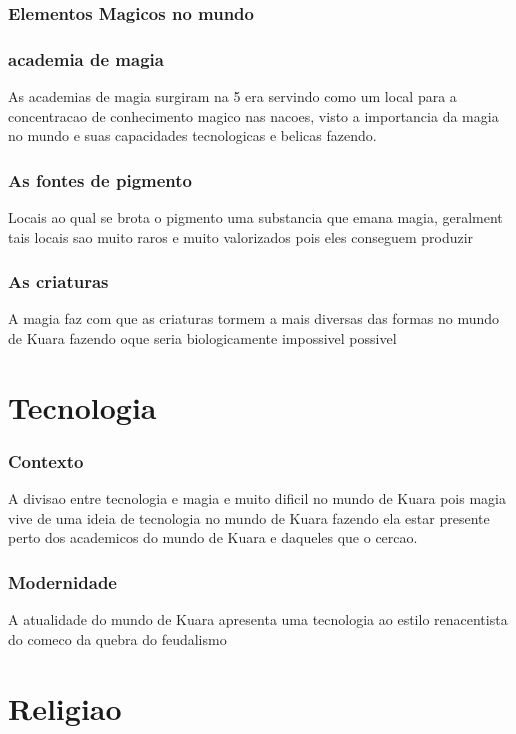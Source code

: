 \documentclass{book}
\begin{document}
\section*{Elementos Magicos no mundo }
\section*{academia de magia}
As academias de magia surgiram na 5 era servindo como um local para a concentracao de 
conhecimento magico nas nacoes, visto a importancia da magia no mundo e suas capacidades 
tecnologicas e belicas fazendo. 
\section*{As fontes de pigmento}
Locais ao qual se brota o pigmento uma substancia que emana magia, geralment tais locais 
sao muito raros e muito valorizados pois eles conseguem produzir 
\section*{As criaturas}
A magia faz com que as criaturas tormem a mais diversas das formas no mundo de Kuara 
fazendo oque seria biologicamente impossivel possivel

\part{Tecnologia}
\section*{Contexto}
A divisao entre tecnologia e magia e muito dificil no mundo de Kuara pois magia vive de uma 
ideia de tecnologia no mundo de Kuara fazendo ela estar presente perto dos academicos do 
mundo de Kuara e daqueles que o cercao. 
\section*{Modernidade}
A atualidade do mundo de Kuara apresenta uma tecnologia ao estilo renacentista do comeco da 
quebra do feudalismo 

\part{Religiao}
\end{document}
